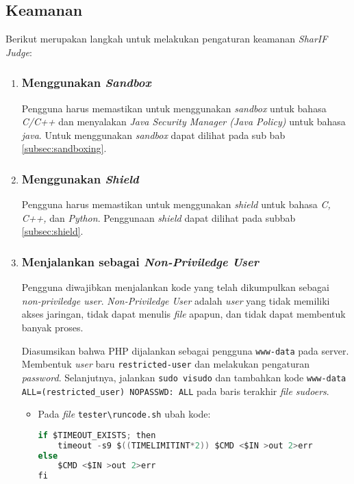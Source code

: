 \subsection{Keamanan}
Berikut merupakan langkah untuk melakukan pengaturan keamanan \textit{SharIF Judge}:
\begin{enumerate}
\item \subsubsection{Menggunakan \textit{Sandbox}}
Pengguna harus memastikan untuk menggunakan \textit{sandbox} untuk bahasa \textit{C/C++} dan menyalakan \textit{Java Security Manager (Java Policy)} untuk bahasa \textit{java}. Untuk menggunakan \textit{sandbox} dapat dilihat pada sub bab \ref{subsec:sandboxing}.

\item \subsubsection{Menggunakan \textit{Shield}}
Pengguna harus memastikan untuk menggunakan \textit{shield} untuk bahasa \textit{C, C++,} dan \textit{Python}. Penggunaan \textit{shield} dapat dilihat pada subbab \ref{subsec:shield}.

\item \subsubsection{Menjalankan sebagai \textit{Non-Priviledge User}}
Pengguna diwajibkan menjalankan kode yang telah dikumpulkan sebagai \textit{non-priviledge user}. \textit{Non-Priviledge User} adalah \textit{user} yang tidak memiliki akses jaringan, tidak dapat menulis \textit{file} apapun, dan tidak dapat membentuk banyak proses.

Diasumsikan bahwa PHP dijalankan sebagai pengguna \verb|www-data| pada server. Membentuk \textit{user} baru \verb|restricted-user| dan melakukan pengaturan \textit{password}. Selanjutnya, jalankan \verb|sudo visudo| dan tambahkan kode \verb|www-data ALL=(restricted_user) NOPASSWD: ALL| pada baris terakhir \textit{file sudoers}.
\begin{itemize}

\item Pada \textit{file} \verb|tester\runcode.sh| ubah kode:

\begin{lstlisting}[language=C,caption=Kode \textit{runcode.sh} awal, label=kode:runcodebefore]
if $TIMEOUT_EXISTS; then
	timeout -s9 $((TIMELIMITINT*2)) $CMD <$IN >out 2>err
else
	$CMD <$IN >out 2>err        
fi
\end{lstlisting}


\end{itemize}
\end{enumerate}
